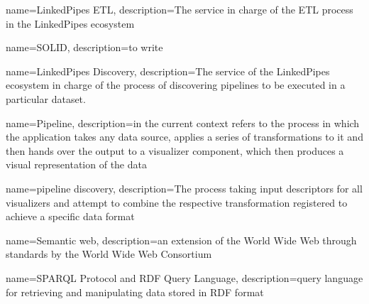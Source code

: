 {
    name={LinkedPipes ETL},
    description={The service in charge of the ETL process in the LinkedPipes ecosystem}
}

{
    name={SOLID},
    description={to write}
}
    
{
    name={LinkedPipes Discovery},
    description={The service of the LinkedPipes ecosystem in charge of the process of discovering pipelines to be executed in a particular dataset.}
}

{
    name=Pipeline,
    description={in the current context refers to the process in which the application takes any data source, applies a series of transformations to it and then hands over the output to a visualizer component, which then produces a visual representation of the data}
}

{
    name={pipeline discovery},
    description={The process taking input descriptors for all visualizers and attempt to combine the respective transformation registered to achieve a specific data format}
}

{
    name={Semantic web},
    description={an extension of the World Wide Web through standards by the World Wide Web Consortium}
}

{
    name={SPARQL Protocol and RDF Query Language},
    description={query language for retrieving and manipulating data stored in RDF format}
}
